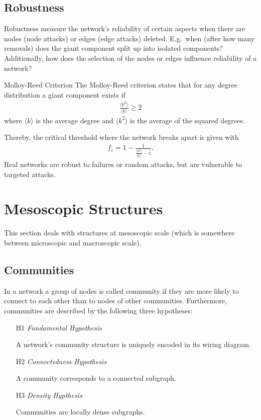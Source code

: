 \documentclass[english]{panikzettel}
\begin{document}
\subsection{Robustness}
Robustness measure the network's reliability of certain aspects when there are nodes (node attacks) or edges (edge attacks) deleted.
E.g.\ when (after how many removals) does the giant component split up into isolated components?
Additionally, how does the selection of the nodes or edges influence reliability of a network?

\begin{defi}{Molloy-Reed Criterion}
The Molloy-Reed criterion states that for any degree distribution a giant component exists if
\begin{align*}
	\frac{\langle k^2 \rangle}{\langle k \rangle} \geq 2
\end{align*}
where $ \langle k \rangle $ is the average degree and $ \langle k^2 \rangle $ is the average of the squared degrees.
\end{defi}

Thereby, the critical threshold where the network breaks apart is given with
\begin{align*}
	f_c = 1 - \frac{1}{\frac{\langle k^2 \rangle}{\langle k \rangle} - 1}.
\end{align*}
Real networks are robust to failures or random attacks, but are vulnerable to targeted attacks.

\section{Mesoscopic Structures}
This section deals with structures at mesoscopic scale (which is somewhere between microscopic and macroscopic scale).

\subsection{Communities}
In a network a group of nodes is called community if they are more likely to connect to each other than to nodes of other communities. Furthermore, communities are described by the following three hypotheses:
\begin{itemize}
	\item[H1] \textit{Fundamental Hypothesis}

	A network's community structure is uniquely encoded	in its wiring diagram.

	\item[H2] \textit{Connectedness Hypothesis}

	A community corresponds to a connected subgraph.

	\item[H3] \textit{Density Hypthesis}

	Communities are locally dense subgraphs.
\end{itemize}
\end{document}
